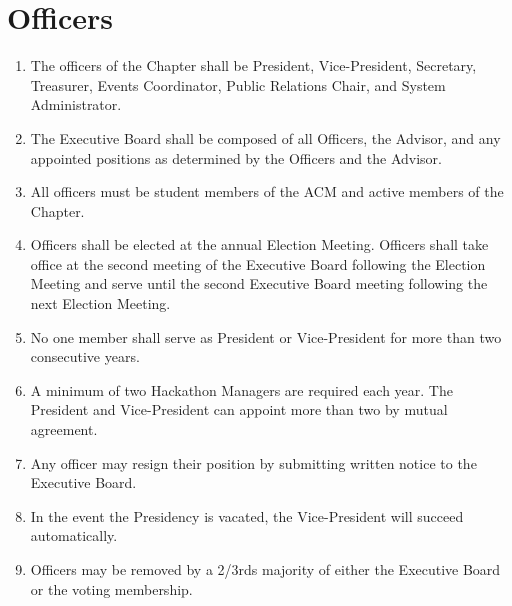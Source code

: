 \documentclass[12pt, letterpaper, oneside]{book}
\begin{document}
\section{Officers}
\begin{enumerate}
    \item The officers of the Chapter shall be President, Vice-President,
        Secretary, Treasurer, Events Coordinator, Public Relations Chair, and
        System Administrator.
    \item The Executive Board shall be composed of all Officers, the Advisor,
        and any appointed positions as determined by the Officers and the
        Advisor.
    \item All officers must be student members of the ACM and active members of
        the Chapter.
    \item Officers shall be elected at the annual Election Meeting. Officers
        shall take office at the second meeting of the Executive Board following
        the Election Meeting and serve until the second Executive Board meeting
        following the next Election Meeting.
    \item No one member shall serve as President or Vice-President for more
        than two consecutive years.
    \item A minimum of two Hackathon Managers are required each year. The
        President and Vice-President can appoint more than two by mutual
        agreement.
    \item Any officer may resign their position by submitting written notice to
        the Executive Board.
    \item In the event the Presidency is vacated, the Vice-President will
        succeed automatically.
    \item Officers may be removed by a 2/3rds majority of either the Executive
        Board or the voting membership. 
\end{enumerate}
\end{document}
